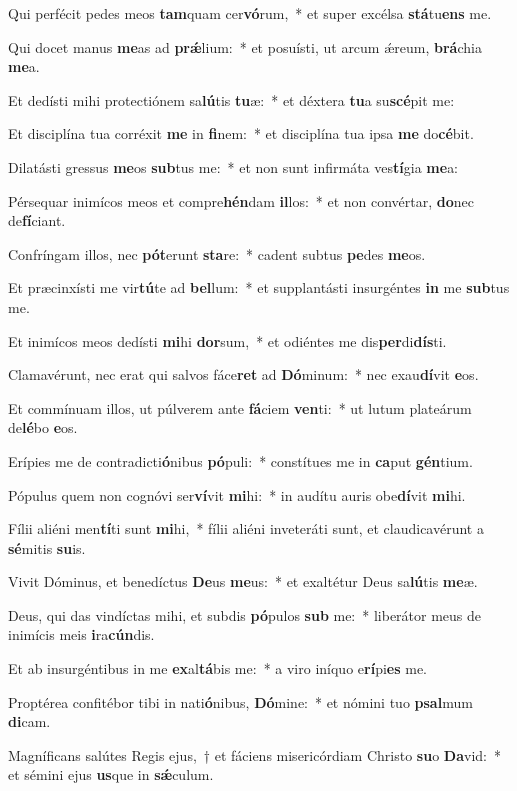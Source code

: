 \item Qui perfécit pedes meos \textbf{tam}quam cer\textbf{vó}rum,~* et super excélsa \textbf{stá}tu\textbf{ens} me.
\item Qui docet manus \textbf{me}as ad \textbf{prǽ}lium:~* et posuísti, ut arcum ǽreum, \textbf{brá}chia \textbf{me}a.
\item Et dedísti mihi protectiónem sa\textbf{lú}tis \textbf{tu}æ:~* et déxtera \textbf{tu}a su\textbf{scé}pit me:
\item Et disciplína tua corréxit \textbf{me} in \textbf{fi}nem:~* et disciplína tua ipsa \textbf{me} do\textbf{cé}bit.
\item Dilatásti gressus \textbf{me}os \textbf{sub}tus me:~* et non sunt infirmáta ves\textbf{tí}gia \textbf{me}a:
\item Pérsequar inimícos meos et compre\textbf{hén}dam \textbf{il}los:~* et non convértar, \textbf{do}nec de\textbf{fí}ciant.
\item Confríngam illos, nec \textbf{pót}erunt \textbf{sta}re:~* cadent subtus \textbf{pe}des \textbf{me}os.
\item Et præcinxísti me vir\textbf{tú}te ad \textbf{bel}lum:~* et supplantásti insurgéntes \textbf{in} me \textbf{sub}tus me.
\item Et inimícos meos dedísti \textbf{mi}hi \textbf{dor}sum,~* et odiéntes me dis\textbf{per}di\textbf{dís}ti.
\item Clamavérunt, nec erat qui salvos fáce\textbf{ret} ad \textbf{Dó}minum:~* nec exau\textbf{dí}vit \textbf{e}os.
\item Et commínuam illos, ut púlverem ante \textbf{fá}ciem \textbf{ven}ti:~* ut lutum plateárum de\textbf{lé}bo \textbf{e}os.
\item Erípies me de contradicti\textbf{ó}nibus \textbf{pó}puli:~* constítues me in \textbf{ca}put \textbf{gén}tium.
\item Pópulus quem non cognóvi ser\textbf{ví}vit \textbf{mi}hi:~* in audítu auris obe\textbf{dí}vit \textbf{mi}hi.
\item Fílii aliéni men\textbf{tí}ti sunt \textbf{mi}hi,~* fílii aliéni inveteráti sunt, et claudicavérunt a \textbf{sé}mitis \textbf{su}is.
\item Vivit Dóminus, et benedíctus \textbf{De}us \textbf{me}us:~* et exaltétur Deus sa\textbf{lú}tis \textbf{me}æ.
\item Deus, qui das vindíctas mihi, et subdis \textbf{pó}pulos \textbf{sub} me:~* liberátor meus de inimícis meis \textbf{i}ra\textbf{cún}dis.
\item Et ab insurgéntibus in me \textbf{ex}al\textbf{tá}bis me:~* a viro iníquo e\textbf{rí}pi\textbf{es} me.
\item Proptérea confitébor tibi in nati\textbf{ó}nibus, \textbf{Dó}mine:~* et nómini tuo \textbf{psal}mum \textbf{di}cam.
\item Magníficans salútes Regis ejus,~† et fáciens misericórdiam Christo \textbf{su}o \textbf{Da}vid:~* et sémini ejus \textbf{us}que in \textbf{sǽ}culum.
